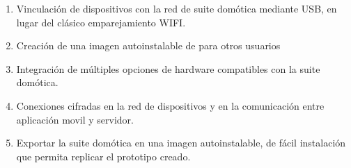 \begin{enumerate}

  \item Vinculación de dispositivos con la red de suite domótica mediante USB, en lugar del clásico emparejamiento WIFI.

  \item Creación de una imagen autoinstalable de para otros usuarios

  \item Integración de múltiples opciones de hardware compatibles con la suite domótica.

  \item Conexiones cifradas en la red de dispositivos y en la comunicación entre aplicación movil y servidor.

  \item Exportar la suite domótica en una imagen autoinstalable, de fácil instalación que permita replicar el prototipo creado.

\end{enumerate}
